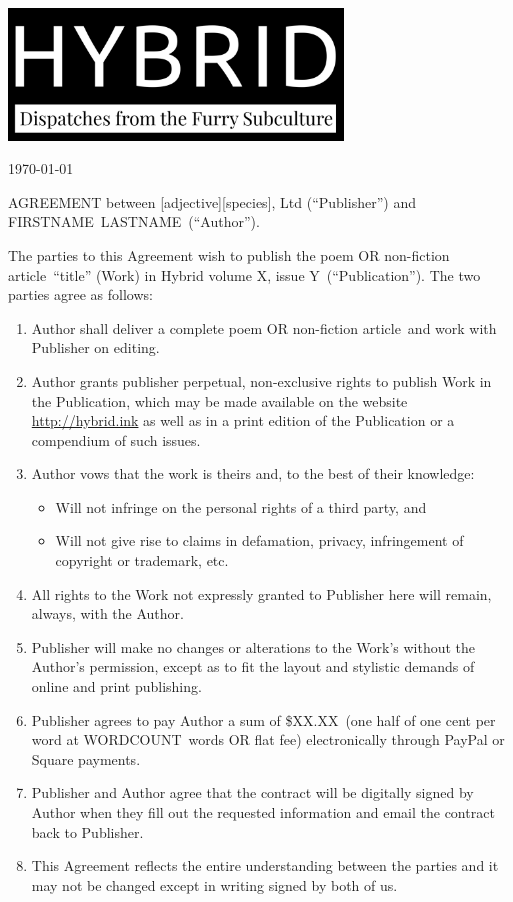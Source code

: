 \documentclass[12pt,letterpaper,oneside]{article}
\def\authorfirst{FIRSTNAME}
\def\authorlast{LASTNAME}
\def\worktitle{title}
\def\worktype{poem OR non-fiction article}
\def\workwords{WORDCOUNT}
\def\issue{volume X, issue Y}
\def\fee{\$XX.XX}
\def\rate{one half of one cent per word at \workwords\ words OR flat fee}
\begin{document}
  \noindent\includegraphics[width=3.5in]{logo}

  \vspace{.5in}

  \today

  \vspace{.5in}

  AGREEMENT between [adjective][species], Ltd (``Publisher'') and \authorfirst\ \authorlast\ (``Author'').

  The parties to this Agreement wish to publish the \worktype\ ``\worktitle'' (Work) in Hybrid \issue\ (``Publication''). The two parties agree as follows:

  \begin{enumerate}
    \item Author shall deliver a complete \worktype\ and work with Publisher on editing.
    \item Author grants publisher perpetual, non-exclusive rights to publish Work in the Publication, which may be made available on the website \url{http://hybrid.ink} as well as in a print edition of the Publication or a compendium of such issues.
    \item Author vows that the work is theirs and, to the best of their knowledge:
    \begin{itemize}
      \item Will not infringe on the personal rights of a third party, and
      \item Will not give rise to claims in defamation, privacy, infringement of copyright or trademark, etc.
    \end{itemize}
    \item All rights to the Work not expressly granted to Publisher here will remain, always, with the Author.
    \item Publisher will make no changes or alterations to the Work's without the Author’s permission, except as to fit the layout and stylistic demands of online and print publishing.
    \item Publisher agrees to pay Author a sum of \fee\ (\rate) electronically through PayPal or Square payments.
    \item Publisher and Author agree that the contract will be digitally signed by Author when they fill out the requested information and email the contract back to Publisher.
    \item This Agreement reflects the entire understanding between the parties and it may not be changed except in writing signed by both of us.
  \end{enumerate}
\end{document}
